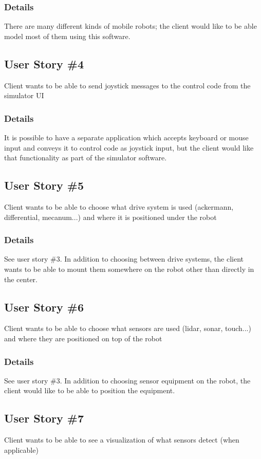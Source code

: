 \subsubsection*{Details}
There are many different kinds of mobile robots; the client would like to be able model most of them using this software.

\subsection{User Story \#4} 
Client wants to be able to send joystick messages to the control code from the simulator UI

\subsubsection*{Details}
It is possible to have a separate application which accepts keyboard or mouse input and conveys it to control code as joystick input, but the client would like that functionality as part of the simulator software.

\subsection{User Story \#5}
Client wants to be able to choose what drive system is used (ackermann, differential, mecanum...) and where it is positioned under the robot

\subsubsection*{Details}
See user story \#3. In addition to choosing between drive systems, the client wants to be able to mount them somewhere on the robot other than directly in the center.

\subsection{User Story \#6} 
Client wants to be able to choose what sensors are used (lidar, sonar, touch...) and where they are positioned on top of the robot

\subsubsection*{Details}
See user story \#3. In addition to choosing sensor equipment on the robot, the client would like to be able to position the equipment.

\subsection{User Story \#7} 
Client wants to be able to see a visualization of what sensors detect (when applicable)

